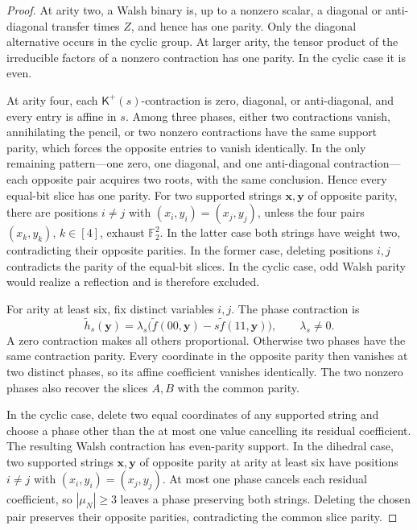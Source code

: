 \documentclass[11pt,letterpaper,onecolumn]{article}
\theoremstyle{plain}
\theoremstyle{definition}
\theoremstyle{remark}
\newcommand{\Ftwo}{\mathbb F_2}
\begin{document}
	\begin{proof}
		At arity two, a Walsh binary is, up to a nonzero scalar, a diagonal or
		anti-diagonal transfer times \(Z\), and hence has one parity.  Only the
		diagonal alternative occurs in the cyclic group.  At larger arity, the
		tensor product of the irreducible factors of a nonzero contraction has one parity. In the
		cyclic case it is even.
		
		At arity four, each \(\mathsf K^+(s)\)-contraction is zero, diagonal, or
		anti-diagonal, and every entry is affine in \(s\).  Among three phases,
		either two contractions vanish, annihilating the pencil, or two nonzero contractions have
		the same support parity, which forces the opposite entries to vanish
		identically.  In the only remaining pattern---one zero, one diagonal, and
		one anti-diagonal contraction---each opposite pair acquires two roots, with the
		same conclusion.  Hence every equal-bit slice has one parity.
		For two supported strings \({\mathbf x},{\mathbf y}\) of opposite parity,
        there are positions \(i\ne j\) with \((x_i,y_i)=(x_j,y_j)\),
        unless the four pairs \((x_k,y_k)\), \(k\in[4]\), exhaust \(\Ftwo^2\).
        In the latter case both strings have weight two, contradicting their
        opposite parities. In the former case, deleting positions \(i,j\)
        contradicts the parity of the equal-bit slices.  In the cyclic case, odd Walsh parity would
		realize a reflection and is therefore excluded.
		
		For arity at least six, fix distinct variables \(i,j\).  The phase contraction is
		\[
		\widetilde h_s({\mathbf y})=\lambda_s\bigl(\widetilde f(00,{\mathbf y})
		-s\widetilde f(11,{\mathbf y})\bigr),
		\qquad \lambda_s\ne0.
		\]
		A zero contraction makes all others proportional.  Otherwise two phases have the
		same contraction parity.  Every coordinate in the opposite parity then
		vanishes at two distinct phases, so its affine coefficient vanishes
		identically. The two nonzero phases also recover the slices \(A,B\) with
		the common parity.
		
		In the cyclic case, delete two equal coordinates of any supported string and
		choose a phase other than the at most one value cancelling its residual
		coefficient. The resulting Walsh contraction has even-parity support. In the dihedral case,
        two supported strings \({\mathbf x},{\mathbf y}\) of opposite parity at
        arity at least six have positions \(i\ne j\) with
        \((x_i,y_i)=(x_j,y_j)\).  At most one phase cancels each residual
		coefficient, so \(|\mu_N|\ge3\) leaves a phase preserving both strings.
		Deleting the chosen pair preserves their opposite parities, contradicting
		the common slice parity.
	\end{proof}
	
\end{document}

